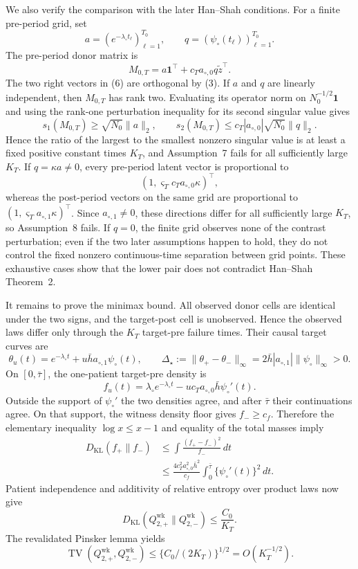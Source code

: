We also verify the comparison with the later Han--Shah conditions.  For a finite pre-period grid, set
\[
 a=(e^{-\lambda_\circ t_\ell})_{\ell=1}^{T_0},
 \qquad q=(\psi_\circ(t_\ell))_{\ell=1}^{T_0}.
\]
The pre-period donor matrix is
\[
 M_{0,T}=a\mathbf1^\top+c_Ta_{\circ,0}q\widetilde z^\top. \tag{6}
\]
The two right vectors in (6) are orthogonal by (3).  If \(a\) and \(q\) are linearly independent, then \(M_{0,T}\) has rank two.  Evaluating its operator norm on \(N_0^{-1/2}\mathbf1\) and using the rank-one perturbation inequality for its second singular value gives
\[
 s_1(M_{0,T})\ge\sqrt{N_0}\|a\|_2,
 \qquad
 s_2(M_{0,T})\le c_T|a_{\circ,0}|\sqrt{N_0}\|q\|_2.    \tag{7}
\]
Hence the ratio of the largest to the smallest nonzero singular value is at least a fixed positive constant times \(K_T\), and Assumption~7 fails for all sufficiently large \(K_T\).  If \(q=\kappa a\ne0\), every pre-period latent vector is proportional to
\[
 (1,\varsigma_Tc_Ta_{\circ,0}\kappa)^\top,              \tag{8}
\]
whereas the post-period vectors on the same grid are proportional to
\((1,\varsigma_Ta_{\circ,1}\kappa)^\top\).  Since \(a_{\circ,1}\ne0\), these directions differ for all sufficiently large \(K_T\), so Assumption~8 fails.  If \(q=0\), the finite grid observes none of the contrast perturbation; even if the two later assumptions happen to hold, they do not control the fixed nonzero continuous-time separation between grid points.  These exhaustive cases show that the lower pair does not contradict Han--Shah Theorem~2.

It remains to prove the minimax bound.  All observed donor cells are identical under the two signs, and the target-post cell is unobserved.  Hence the observed laws differ only through the \(K_T\) target-pre failure times.  Their causal target curves are
\[
 \theta_u(t)=e^{-\lambda_\circ t}+u\bar h a_{\circ,1}\psi_\circ(t),
 \qquad
 \Delta_\star:=\|\theta_+-\theta_-\|_\infty
 =2\bar h|a_{\circ,1}|\|\psi_\circ\|_\infty>0.         \tag{9}
\]
On \([0,\bar\tau]\), the one-patient target-pre density is
\[
 f_u(t)=\lambda_\circ e^{-\lambda_\circ t}
        -u c_Ta_{\circ,0}\bar h\psi_\circ'(t).          \tag{10}
\]
Outside the support of \(\psi_\circ'\) the two densities agree, and after \(\bar\tau\) their continuations agree.  On that support, the witness density floor gives \(f_-\ge c_f\).  Therefore the elementary inequality \(\log x\le x-1\) and equality of the total masses imply
\[
 \begin{aligned}
 D_{\mathrm{KL}}(f_+\|f_-)
 &\le \int\frac{(f_+-f_-)^2}{f_-}\,dt\\
 &\le \frac{4c_T^2a_{\circ,0}^2\bar h^2}{c_f}
       \int_0^{\bar\tau}\{\psi_\circ'(t)\}^2\,dt.
 \end{aligned}                                           \tag{11}
\]
Patient independence and additivity of relative entropy over product laws now give
\[
 D_{\mathrm{KL}}(Q_{2,+}^{\mathrm{wk}}\|Q_{2,-}^{\mathrm{wk}})
 \le \frac{C_0}{K_T}.                                    \tag{12}
\]
The revalidated Pinsker lemma yields
\[
 \operatorname{TV}(Q_{2,+}^{\mathrm{wk}},Q_{2,-}^{\mathrm{wk}})
 \le\{C_0/(2K_T)\}^{1/2}=O(K_T^{-1/2}).                 \tag{13}
\]

